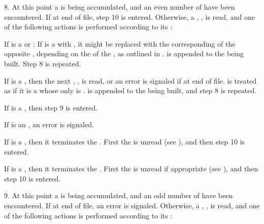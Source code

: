 \item{8.}
At this point a  is being accumulated, and an even number
of   have been encountered.
If at end of file, step 10 is entered.
Otherwise, a , , is read, and
one of the following actions is performed according to its :

\beginlist
\itemitem{\bull}
If  is a  or  :
\beginlist
\itemitem{--}
If  is a  with ,
it might be replaced with the corresponding  of the opposite , 
depending on the  of the ,
as outlined in \secref\ReadtableCaseReadEffect.
\itemitem{--}
 is appended to the  being built.
\itemitem{--}
Step 8 is repeated.
\endlist

\itemitem{\bull}
If  is a  , then the next ,
, is read, or an error  is signaled if at end of file.
 is treated as if it is a  
whose only  is .
 is appended to the  being built,
and step 8 is repeated.

\itemitem{\bull}
If  is a  ,
then step 9 is entered.

\itemitem{\bull}
If  is an  ,
an error  is signaled.

\itemitem{\bull}
If  is a  ,
then it terminates the .
First the   is unread (see ),
and then step 10 is entered.

\itemitem{\bull}
If  is a  , then it terminates
the .  First the   is unread
if appropriate (see ),
and then step 10 is entered.
\endlist

\item{9.}
At this point a  is being accumulated, and an odd number
of   have been encountered.
If at end of file, an error  is signaled.
Otherwise, a , , is read, and
one of the following actions is performed according to its :

